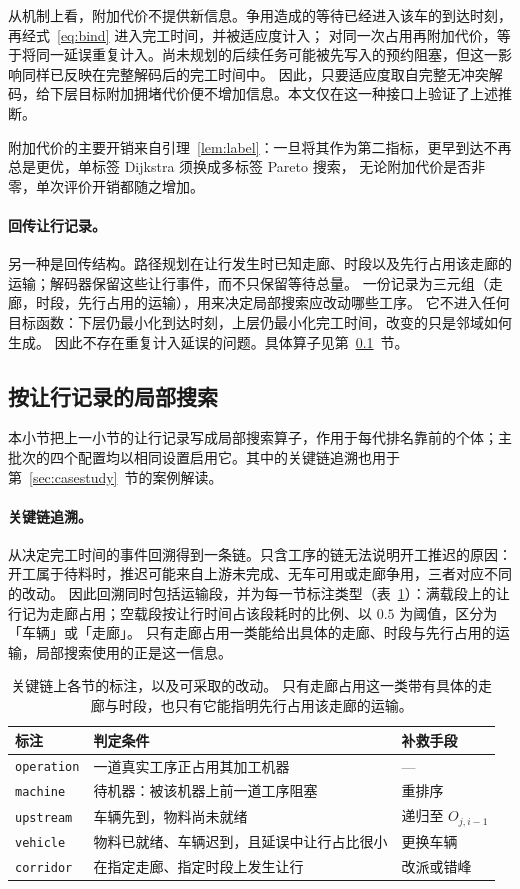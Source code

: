 \documentclass[manuscript,screen,review]{acmart}
\begin{document}
从机制上看，附加代价不提供新信息。争用造成的等待已经进入该车的到达时刻，再经式~\eqref{eq:bind} 进入完工时间，并被适应度计入；
对同一次占用再附加代价，等于将同一延误重复计入。尚未规划的后续任务可能被先写入的预约阻塞，但这一影响同样已反映在完整解码后的完工时间中。
因此，只要适应度取自完整无冲突解码，给下层目标附加拥堵代价便不增加信息。本文仅在这一种接口上验证了上述推断。

附加代价的主要开销来自引理~\ref{lem:label}：一旦将其作为第二指标，更早到达不再总是更优，单标签 Dijkstra 须换成多标签 Pareto 搜索，
无论附加代价是否非零，单次评价开销都随之增加。


\paragraph{回传让行记录。}
另一种是回传结构。路径规划在让行发生时已知走廊、时段以及先行占用该走廊的运输；解码器保留这些让行事件，而不只保留等待总量。
一份记录为三元组（走廊，时段，先行占用的运输），用来决定局部搜索应改动哪些工序。
它不进入任何目标函数：下层仍最小化到达时刻，上层仍最小化完工时间，改变的只是邻域如何生成。
因此不存在重复计入延误的问题。具体算子见第~\ref{sec:ls}~节。

\subsection{按让行记录的局部搜索}
\label{sec:ls}
本小节把上一小节的让行记录写成局部搜索算子，作用于每代排名靠前的个体；主批次的四个配置均以相同设置启用它。其中的关键链追溯也用于第~\ref{sec:casestudy}~节的案例解读。

\paragraph{关键链追溯。}
从决定完工时间的事件回溯得到一条链。只含工序的链无法说明开工推迟的原因：开工属于待料时，推迟可能来自上游未完成、无车可用或走廊争用，三者对应不同的改动。
因此回溯同时包括运输段，并为每一节标注类型（表~\ref{tab:attrib}）：满载段上的让行记为走廊占用；空载段按让行时间占该段耗时的比例、以 $0.5$ 为阈值，区分为「车辆」或「走廊」。
只有走廊占用一类能给出具体的走廊、时段与先行占用的运输，局部搜索使用的正是这一信息。

\begin{table}[t]
  \caption{关键链上各节的标注，以及可采取的改动。
  只有走廊占用这一类带有具体的走廊与时段，也只有它能指明先行占用该走廊的运输。}
\label{tab:attrib}
\footnotesize
\begin{tabular}{@{}llp{2.55cm}@{}}
\toprule
标注 & 判定条件 & 补救手段 \\
\midrule
\texttt{operation} & 一道真实工序正占用其加工机器 & --- \\
\texttt{machine} & 待机器：被该机器上前一道工序阻塞
  & 重排序 \\
\texttt{upstream} & 车辆先到，物料尚未就绪 & 递归至 $O_{j,i-1}$ \\
\texttt{vehicle} & 物料已就绪、车辆迟到，且延误中让行占比很小 & 更换车辆 \\
\texttt{corridor} & 在指定走廊、指定时段上发生让行 & 改派或错峰 \\
\bottomrule
\end{tabular}
\end{table}
\end{document}
